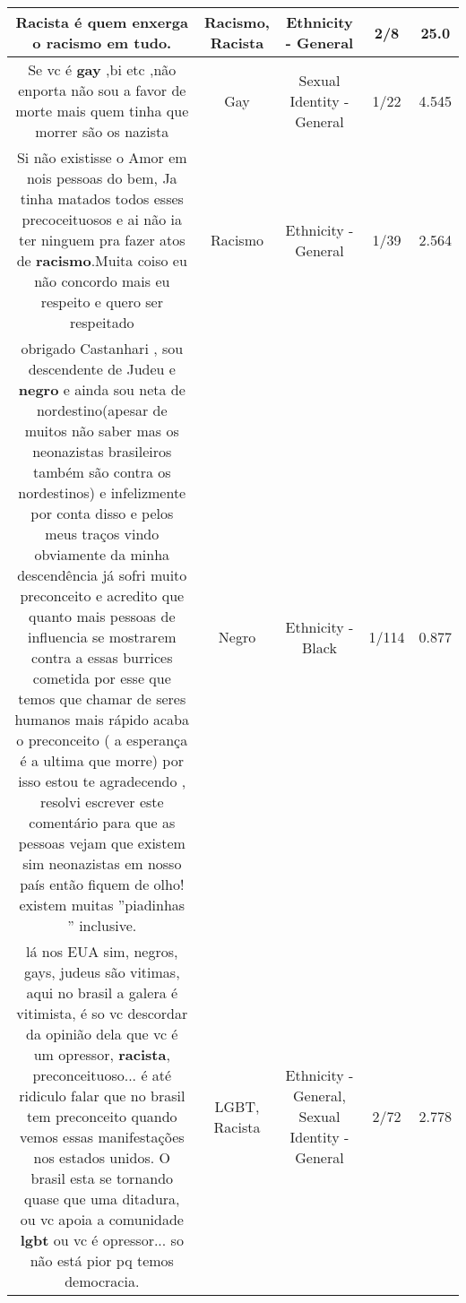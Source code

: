 \documentclass[11pt]{article}
\newlength\mylength
\begin{document}
\begin{center}
\begin{longtable}{|C{.65\mylength}|C{.30\mylength}|C{.12\mylength}|C{.12\mylength}|C{.12\mylength}|}
  \small Racista é quem enxerga o \textbf{racismo} em tudo.\normalsize   & Racismo, Racista & Ethnicity - General & 2/8 & 25.0 \\  \hline
  \small Se vc é \textbf{gay} ,bi etc ,não enporta não sou a favor de morte mais quem tinha que morrer são os nazista\normalsize   & Gay & Sexual Identity - General & 1/22 & 4.545 \\  \hline
  \small Si não existisse o Amor em nois pessoas do bem, Ja tinha matados todos esses precoceituosos e ai não ia ter ninguem pra fazer atos de \textbf{racismo}.Muita coiso eu não concordo mais eu respeito e quero ser respeitado\normalsize   & Racismo & Ethnicity - General & 1/39 & 2.564 \\  \hline
  \small obrigado Castanhari , sou descendente de Judeu e \textbf{negro} e ainda sou neta de nordestino(apesar de muitos não saber mas os neonazistas brasileiros também são contra os nordestinos) e infelizmente por conta disso e pelos meus traços vindo obviamente da minha descendência já sofri muito preconceito e acredito que quanto mais pessoas de influencia se mostrarem contra a essas burrices cometida por esse que temos que chamar de seres humanos mais rápido acaba o preconceito ( a esperança é a ultima que morre) por isso estou te agradecendo , resolvi escrever este comentário para que as pessoas vejam que existem sim neonazistas em nosso país então fiquem de olho! existem muitas ''piadinhas '' inclusive.\normalsize   & Negro & Ethnicity - Black & 1/114 & 0.877 \\  \hline
  \small lá nos EUA sim, negros, gays, judeus são vitimas, aqui no brasil a galera é vitimista, é so vc descordar da opinião dela que vc é um opressor, \textbf{racista}, preconceituoso... é até ridiculo falar que no brasil tem preconceito quando vemos essas manifestações nos estados unidos. O brasil esta se tornando quase que uma ditadura, ou vc apoia a comunidade \textbf{lgbt} ou vc é opressor... so não está pior pq temos democracia.\normalsize   & LGBT, Racista & Ethnicity - General, Sexual Identity - General & 2/72 & 2.778 \\  \hline

\end{longtable}
\end{center}
\end{document}
